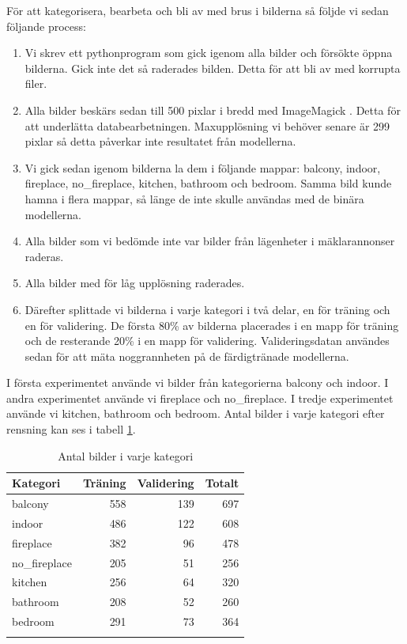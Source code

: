 \documentclass[]{kththesis}
\begin{document}
För att kategorisera, bearbeta och bli av med brus i bilderna så följde vi sedan följande process:
\begin{enumerate}
  \item Vi skrev ett pythonprogram som gick igenom alla bilder och försökte öppna bilderna. Gick inte det så raderades bilden. Detta för att bli av med korrupta filer.
  \item Alla bilder beskärs sedan till 500 pixlar i bredd med ImageMagick \parencite{imagemagick}. Detta för att underlätta databearbetningen. Maxupplösning vi behöver senare är 299 pixlar så detta påverkar inte resultatet från modellerna.
  \item Vi gick sedan igenom bilderna la dem i följande mappar: balcony, indoor, fireplace, no\_fireplace, kitchen, bathroom och bedroom. Samma bild kunde hamna i flera mappar, så länge de inte skulle användas med de binära modellerna.
  \item Alla bilder som vi bedömde inte var bilder från lägenheter i mäklarannonser raderas.
  \item Alla bilder med för låg upplösning raderades.
  \item Därefter splittade vi bilderna i varje kategori i två delar, en för träning och en för validering. De första 80\% av bilderna placerades i en mapp för träning och de resterande 20\% i en mapp för validering. Valideringsdatan användes sedan för att mäta noggrannheten på de färdigtränade modellerna.
\end{enumerate}

I första experimentet använde vi bilder från kategorierna balcony och indoor. I andra experimentet använde vi fireplace och no\_fireplace. I tredje experimentet använde vi kitchen, bathroom och bedroom. Antal bilder i varje kategori efter rensning kan ses i tabell \ref{table:amount_images}.
\begin{table}
  \caption{Antal bilder i varje kategori}
  \centering
  \begin{tabular}{ lrrr }
  Kategori & Träning & Validering & Totalt \\  
  \hline
  balcony       & 558 & 139 & 697 \\ 
  indoor        & 486 & 122 & 608 \\ 
  fireplace     & 382 &  96 & 478 \\ 
  no\_fireplace & 205 &  51 & 256 \\
  kitchen       & 256 &  64 & 320 \\
  bathroom      & 208 &  52 & 260 \\ 
  bedroom       & 291 &  73 & 364 \\ 
  \hline
  \label{table:amount_images}
  \end{tabular}
\end{table}
\end{document}
